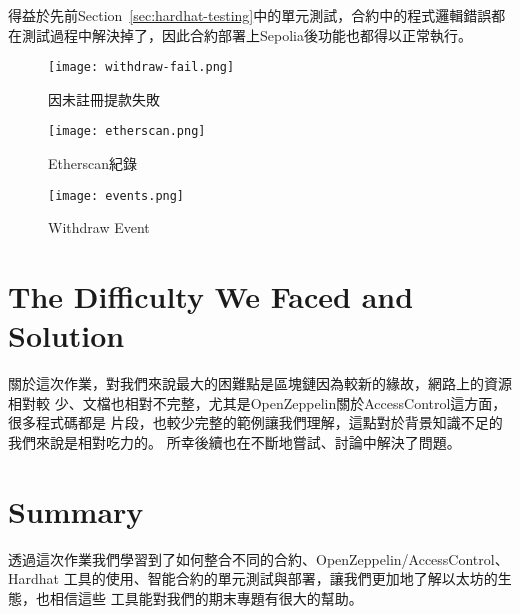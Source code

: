 得益於先前Section~\ref{sec:hardhat-testing}中的單元測試，合約中的程式邏輯錯誤都
在測試過程中解決掉了，因此合約部署上Sepolia後功能也都得以正常執行。

\begin{figure}[H]
  \centering
  \texttt{[image: withdraw-fail.png]}
  \caption{因未註冊提款失敗}
  \label{fig:withdraw-fail}
\end{figure}


\begin{figure}[H]
  \centering
  \texttt{[image: etherscan.png]}
  \caption{Etherscan紀錄}
  \label{fig:etherscan}
\end{figure}

\begin{figure}[H]
  \centering
  \texttt{[image: events.png]}
  \caption{Withdraw Event}
  \label{fig:withdraw-event}
\end{figure}

\section{The Difficulty We Faced and Solution}

關於這次作業，對我們來說最大的困難點是區塊鏈因為較新的緣故，網路上的資源相對較
少、文檔也相對不完整，尤其是OpenZeppelin關於AccessControl這方面，很多程式碼都是
片段，也較少完整的範例讓我們理解，這點對於背景知識不足的我們來說是相對吃力的。
所幸後續也在不斷地嘗試、討論中解決了問題。

\section{Summary}

透過這次作業我們學習到了如何整合不同的合約、OpenZeppelin/AccessControl、Hardhat
工具的使用、智能合約的單元測試與部署，讓我們更加地了解以太坊的生態，也相信這些
工具能對我們的期末專題有很大的幫助。

